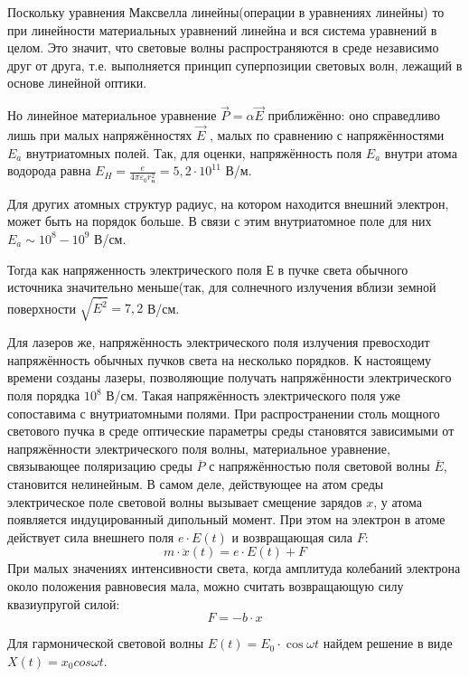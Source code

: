\documentclass[12pt,a5paper,titlepage, main = russian]{article}
\begin{document}
Поскольку уравнения Максвелла линейны(операции в уравнениях линейны) то при линейности материальных уравнений линейна и вся система уравнений в целом. Это
значит, что световые волны распространяются в среде независимо друг
от друга, т.е. выполняется принцип суперпозиции световых волн, лежащий в основе линейной оптики.

Но линейное материальное уравнение $\vec{P} = \alpha \vec{E}$ приближённо: оно
справедливо лишь при малых напряжённостях $\vec{E}$ , малых по сравнению с напряжённостями $E_a$ внутриатомных полей. Так, для оценки, напряжённость поля $E_a$ внутри атома водорода равна $E_H = \frac{e}{4 \pi \varepsilon_{0} r_{\text{н}}^{2}} = 5,2 \cdot 10^{11}$ В/м.

Для других атомных структур радиус, на котором находится внешний электрон, может быть на порядок больше. В связи с этим внутриатомное поле для них $E_a \sim 10^8 - 10^9$ В/см.

Тогда как напряженность электрического поля Е в пучке света обычного источника значительно меньше(так, для солнечного излучения вблизи земной поверхности $\sqrt{\overline{E^2}} = 7,2$ В/см.

Для лазеров же, напряжённость электрического поля излучения превосходит напряжённость обычных пучков света на несколько порядков. К настоящему времени созданы лазеры, позволяющие получать напряжённости электрического поля порядка $10^8$ В/см. Такая напряжённость электрического поля уже сопоставима с внутриатомными полями. При распространении столь мощного светового пучка в среде оптические параметры среды становятся зависимыми от напряжённости электрического поля волны, материальное уравнение, связывающее поляризацию среды $\overline{P}$ с напряжённостью поля световой волны $\overline{E}$, становится нелинейным. В самом деле, действующее на атом среды электрическое поле световой волны вызывает смещение зарядов $x$, у атома появляется индуцированный дипольный момент. При этом на электрон в атоме действует сила внешнего поля $e \cdot E(t)$ и возвращающая сила $F$:
\begin{equation}
m \cdot \ddot{x}(t) = e \cdot E(t) + F
\end{equation}
При малых значениях интенсивности света, когда амплитуда колебаний электрона около положения равновесия мала, можно считать возвращающую силу квазиупругой силой:
\begin{equation}
F = -b \cdot x
\label{upr}
\end{equation}

Для гармонической световой волны $E(t) = E_0 \cdot \cos \omega t$ найдем решение в виде $X(t) = x_0 cos \omega t$.
\end{document}
